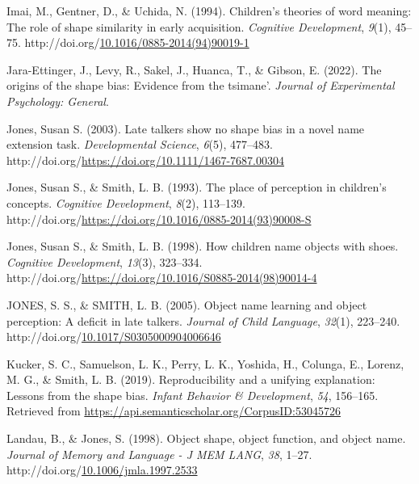 \documentclass[10pt, letterpaper]{article}
\newenvironment{CSLReferences}%
  {}%
  {\par}
\begin{document}
\begin{CSLReferences}{1}{0}
\leavevmode{}%
Imai, M., Gentner, D., \& Uchida, N. (1994). Children's theories of word
meaning: {The} role of shape similarity in early acquisition.
\emph{Cognitive Development}, \emph{9}(1), 45--75.
http://doi.org/\href{https://doi.org/10.1016/0885-2014(94)90019-1}{10.1016/0885-2014(94)90019-1}

\leavevmode{}%
Jara-Ettinger, J., Levy, R., Sakel, J., Huanca, T., \& Gibson, E.
(2022). The origins of the shape bias: Evidence from the tsimane'.
\emph{Journal of Experimental Psychology: General}.

\leavevmode{}%
Jones, Susan S. (2003). Late talkers show no shape bias in a novel name
extension task. \emph{Developmental Science}, \emph{6}(5), 477--483.
http://doi.org/\url{https://doi.org/10.1111/1467-7687.00304}

\leavevmode{}%
Jones, Susan S., \& Smith, L. B. (1993). The place of perception in
children's concepts. \emph{Cognitive Development}, \emph{8}(2),
113--139.
http://doi.org/\url{https://doi.org/10.1016/0885-2014(93)90008-S}

\leavevmode{}%
Jones, Susan S., \& Smith, L. B. (1998). How children name objects with
shoes. \emph{Cognitive Development}, \emph{13}(3), 323--334.
http://doi.org/\url{https://doi.org/10.1016/S0885-2014(98)90014-4}

\leavevmode{}%
JONES, S. S., \& SMITH, L. B. (2005). Object name learning and object
perception: A deficit in late talkers. \emph{Journal of Child Language},
\emph{32}(1), 223--240.
http://doi.org/\href{https://doi.org/10.1017/S0305000904006646}{10.1017/S0305000904006646}

\leavevmode{}%
Kucker, S. C., Samuelson, L. K., Perry, L. K., Yoshida, H., Colunga, E.,
Lorenz, M. G., \& Smith, L. B. (2019). Reproducibility and a unifying
explanation: Lessons from the shape bias. \emph{Infant Behavior \&
Development}, \emph{54}, 156--165. Retrieved from
\url{https://api.semanticscholar.org/CorpusID:53045726}

\leavevmode{}%
Landau, B., \& Jones, S. (1998). Object shape, object function, and
object name. \emph{Journal of Memory and Language - J MEM LANG},
\emph{38}, 1--27.
http://doi.org/\href{https://doi.org/10.1006/jmla.1997.2533}{10.1006/jmla.1997.2533}


\end{CSLReferences}
\end{document}
